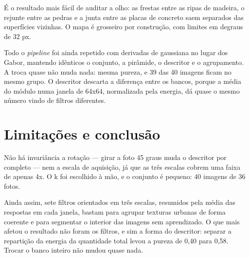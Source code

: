 \documentclass[12pt]{article}
\begin{document}
É o resultado mais fácil de auditar a olho: as frestas entre as ripas de
madeira, o rejunte entre as pedras e a junta entre as placas de concreto saem
separados das superfícies vizinhas. O mapa é grosseiro por construção, com
limites em degraus de 32 px.

Todo o \textit{pipeline} foi ainda repetido com derivadas de gaussiana no
lugar dos Gabor, mantendo idênticos o conjunto, a pirâmide, o descritor e o
agrupamento. A troca quase não muda nada: mesma pureza, e 39 das 40 imagens
ficam no mesmo grupo. O descritor descarta a diferença entre os bancos, porque
a média do módulo numa janela de 64x64, normalizada pela energia, dá quase o
mesmo número vindo de filtros diferentes.

\FloatBarrier

\section{Limitações e conclusão}

Não há invariância a rotação --- girar a foto 45 graus muda o descritor por
completo --- nem a escala de aquisição, já que as três escalas cobrem uma
faixa de apenas 4x. O k foi escolhido à mão, e o conjunto é pequeno: 40
imagens de 36 fotos.

Ainda assim, sete filtros orientados em três escalas, resumidos pela média das
respostas em cada janela, bastam para agrupar texturas urbanas de forma
coerente e para segmentar o interior das imagens sem aprendizado. O que mais
afetou o resultado não foram os filtros, e sim a forma do descritor: separar a
repartição da energia da quantidade total levou a pureza de 0,40 para 0,58.
Trocar o banco inteiro não mudou quase nada.



\end{document}
